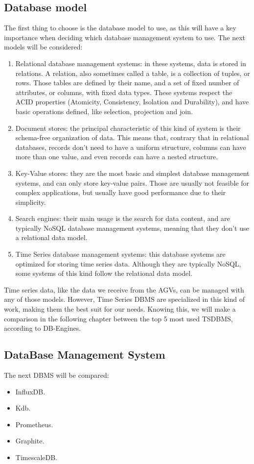\subsection{Database model}
The first thing to choose is the database model to use, as this will have a key importance when deciding which database management system to use.
The next models will be considered:
\begin{enumerate}
    \item Relational database management systems: in these systems, data is stored in relations. A relation, also sometimes called a table, is a collection of tuples, or rows. Those tables are defined by their name, and a set of fixed number of attributes, or columns, with fixed data types. These systems respect the ACID properties (Atomicity, Consistency, Isolation and Durability), and have basic operations defined, like selection, projection and join.
    \item Document stores: the principal characteristic of this kind of system is their schema-free organization of data. This means that, contrary that in relational databases, records don't need to have a uniform structure, columns can have more than one value, and even records can have a nested structure.
    \item Key-Value stores: they are the most basic and simplest database management systems, and can only store key-value pairs. Those are usually not feasible for complex applications, but usually have good performance due to their simplicity.
    \item Search engines: their main usage is the search for data content, and are typically NoSQL database management systems, meaning that they don't use a relational data model.
    \item Time Series database management systems: this database systems are optimized for storing time series data\cite{influx:timeseries}. Although they are typically NoSQL, some systems of this kind follow the relational data model.
\end{enumerate}

Time series data, like the data we receive from the AGVs, can be managed with any of those models. However, Time Series DBMS are specialized in this kind of work, making them the best suit for our needs. Knowing this, we will make a comparison in the following chapter between the top 5 most used TSDBMS, according to DB-Engines\cite{dbengines:rankingTSDBMS}.

\subsection{DataBase Management System}
The next DBMS will be compared:
\begin{itemize}
    \item InfluxDB.
    \item Kdb.
    \item Prometheus.
    \item Graphite.
    \item TimescaleDB.
\end{itemize}

